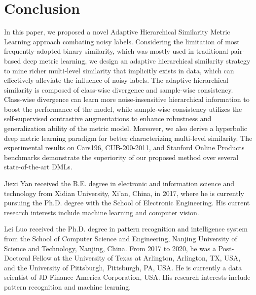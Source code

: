 \documentclass[lettersize,journal]{IEEEtran}
\begin{document}
\section{Conclusion}
\label{conclusion}
In this paper, we proposed a novel Adaptive Hierarchical Similarity Metric Learning approach combating noisy labels. Considering the limitation of most frequently-adopted binary similarity, which was mostly used in traditional pair-based deep metric learning, we design an adaptive hierarchical similarity strategy to mine richer multi-level similarity that implicitly exists in data, which can effectively alleviate the influence of noisy labels. The adaptive hierarchical similarity is composed of class-wise divergence and sample-wise consistency. Class-wise divergence can learn more noise-insensitive hierarchical information to  boost the performance of the model, while sample-wise consistency utilizes the self-supervised contrastive augmentations to 
enhance robustness and generalization ability of the metric model. Moreover, we also derive a hyperbolic deep metric learning paradigm for better characterizing multi-level similarity. The experimental results on Cars196, CUB-200-2011,  and Stanford Online Products benchmarks demonstrate the superiority of our proposed method over several state-of-the-art DMLs.







\begin{IEEEbiography}{Jiexi Yan}
	received the B.E. degree in electronic and information science and technology from Xidian University, Xi’an, China, in 2017, where he is currently
	pursuing the Ph.D. degree with the School of Electronic Engineering.
	His current research interests include machine
	learning and computer vision.
\end{IEEEbiography}

\vspace{11pt}


\begin{IEEEbiography}{Lei Luo}
 received the Ph.D. degree in pattern recognition and intelligence system from the School of Computer Science and Engineering, Nanjing University of Science and Technology, Nanjing, China. From 2017 to 2020, he was a Post-Doctoral Fellow at the University of Texas at Arlington, Arlington, TX, USA, and the University of Pittsburgh, Pittsburgh, PA, USA. He is currently a data scientist of JD Finance America Corporation, USA. His research interests include pattern recognition and machine learning.
\end{IEEEbiography}
\end{document}
